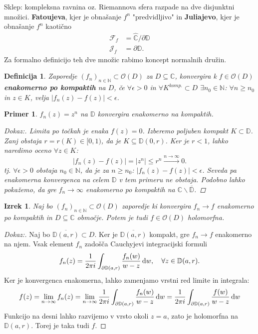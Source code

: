\documentclass{article}
\newtheorem{definicija}{Definicija}
\newtheorem{primer}{Primer}
\newtheorem{izrek}{Izrek}
\newcommand{\C}{\mathbb{C}}
\newcommand{\D}{\mathbb{D}}
\newcommand{\N}{\mathbb{N}}
\newcommand{\Ho}{\mathcal{O}}
\begin{document}
\noindent
Sklep: kompleksna ravnina oz. Riemannova sfera razpade na dve disjunktni množici. \textbf{Fatoujeva}, kjer je obnašanje $f^n$ "predvidljivo" in \textbf{Juliajevo}, kjer je obnašanje $f^n$ kaotično 
\begin{align*}
\mathcal{F}_f &= \hat{\C} \slash \partial \D \\ 
\mathcal{J}_f &= \partial \D.
\end{align*}
Za formalno definicijo teh dve množic rabimo koncept normalnih družin.

\begin{definicija}
Zaporedje $(f_n)_{n\in\N} \subset \Ho(D)$ za $D \subseteq \C$, 
konvergira k $f \in \Ho(D)$ \textbf{enakomerno po kompaktih} na 
$D$, če $\forall \epsilon > 0$ in $\forall K^{komp.} \subset D$ 
$\exists n_0\in \N$: $\forall n \geq n_0$ in $z\in K$, velja 
$|f_n(z) - f(z)| < \epsilon$.
\end{definicija}

\begin{primer}
$f_n(z) = z^n$ na $\D$ konvergira enakomerno na kompaktih.
\begin{proof}[Dokaz:]
    Limita po točkah je enaka $f(z) = 0$. Izberemo poljuben kompakt $K\subset \D$.
    Zanj obstaja $r = r(K) \in [0, 1)$, da je $K \subseteq \D(0, r)$. Ker je $r < 1$, lahko naredimo oceno $\forall z\in K$:
    $$
    |f_n(z) - f(z)| = |z^n| \leq r^n \xrightarrow{n\rightarrow \infty} 0.
    $$
    tj. $\forall \epsilon > 0$ obstaja $n_0 \in \N$, da je za $n \geq n_0$: $|f_n(z) - f(z)| < \epsilon$. 
    Seveda pa enakomerna konvergenca na celem $\D$ v tem primeru ne 
    obstaja. Podobno lahko pokažemo, da gre $f_n \rightarrow \infty$ 
    enakomerno po kompaktih na $\C\backslash \overline{\D}$.
\end{proof}
\end{primer}

\begin{izrek}
Naj bo $(f_n)_{n\in\N} \subset \Ho(D)$ zaporedje ki konvergira $f_n \rightarrow f$ enakomerno po kompaktih in $D\subseteq \C$ območje. Potem je tudi $f \in \Ho(D)$ holomorfna.
\end{izrek}

\begin{proof}[Dokaz:]
Naj bo $\overline{\D(a, r)} \subset D$. Ker je $\overline{\D(a, r)}$ kompakt, 
gre $f_n \rightarrow f$ enakomerno na njem. Vsak element $f_n$ zadošča 
Cauchyjevi integracijski formuli
$$
f_n(z) = \frac{1}{2\pi i} \int_{\partial \D(a, r)} \frac{f_n(w)}{w - z} \dif w, \quad \forall z\in \D(a, r).
$$
Ker je konvergenca enakomerna, lahko zamenjamo vrstni red limite in integrala: 
$$
f(z) = \lim_{n\rightarrow \infty} f_n(z) = \lim_{n\rightarrow \infty} \frac{1}{2\pi i} \int_{\partial \D(a, r)} \frac{f_n(w)}{w - z} \dif w = \frac{1}{2\pi i} \int_{\partial \D(a, r)} \frac{f(w)}{w - z} \dif w
$$
Funkcijo na desni lahko razvijemo v vrsto okoli $z = a$, zato je holomorfna 
na $\D(a, r)$. Torej je taka tudi $f$.
\end{proof}
\end{document}
